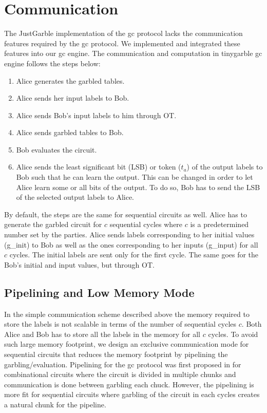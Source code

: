\section{Communication}\label{sec:engine-comm}
The JustGarble implementation of the \acrshort{gc} protocol lacks the communication features required by the \acrshort{gc} protocol.
We implemented and integrated these features into our \acrshort{gc} engine.
The communication and computation in \gls{tinygarble} \acrshort{gc} engine follows the steps below:
\begin{enumerate}
\item Alice generates the garbled tables.
\item Alice sends her input labels to Bob.
\item Alice sends Bob's input labels to him through OT.
\item Alice sends garbled tables to Bob.
\item Bob evaluates the circuit.
\item Alice sends the least significant bit (LSB) or token (${t}_a$) of the output labels to Bob such that he can learn the output.
  This can be changed in order to let Alice learn some or all bits of the output.
  To do so, Bob has to send the LSB of the selected output labels to Alice.
\end{enumerate}

By default, the steps are the same for sequential circuits as well.
Alice has to generate the garbled circuit for $c$ sequential cycles where $c$ is a predetermined number set by the parties.
Alice sends labels corresponding to her initial values (g\_init) to Bob as well as the ones corresponding to her inputs (g\_input) for all $c$ cycles.
The initial labels are sent only for the first cycle.
The same goes for the Bob's initial and input values, but through OT.

\subsection{Pipelining and Low Memory Mode}\label{sec:engine-memory}
In the simple communication scheme described above the memory required to store the labels is not scalable in terms of the number of sequential cycles $c$.
Both Alice and Bob has to store all the labels in the memory for all $c$ cycles.
To avoid such large memory footprint, we design an exclusive communication mode for sequential circuits that reduces the memory footprint by pipelining the garbling/evaluation.
Pipelining for the \acrshort{gc} protocol was first proposed in \cite{husted2013gpu} for combinational circuits where the circuit is divided in multiple chunks and communication is done between garbling each chuck.
However, the pipelining is more fit for sequential circuits where garbling of the circuit in each cycles creates a natural chunk for the pipeline.

